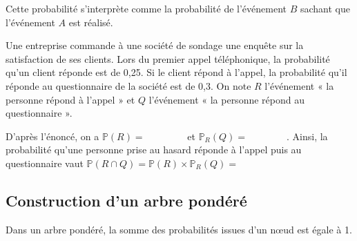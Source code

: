 \documentclass[11pt,fleqn, openany]{book} %
\begin{document}
Cette probabilité s'interprète comme la probabilité de l'événement $B$ sachant que l'événement $A$ est réalisé.

\begin{example}Une entreprise commande à une société de sondage une enquête sur la satisfaction de ses clients. Lors du premier appel téléphonique, la probabilité qu'un client réponde est de 0,25. Si le client répond à l'appel, la probabilité qu'il réponde au questionnaire de la société est de 0,3. On note $R$ l'événement « la personne répond à l'appel » et $Q$ l'événement « la personne répond au questionnaire ». 

D'après l'énoncé, on a $\mathbb{P}(R)=\qquad\qquad$ et $\mathbb{P}_R(Q)=\qquad\qquad$. Ainsi, la probabilité qu'une personne prise au hasard réponde à l'appel puis au questionnaire vaut $\mathbb{P}(R \cap Q) = \mathbb{P}(R) \times \mathbb{P}_R(Q)=$\end{example}

\newpage

\subsection{Construction d'un arbre pondéré}

\begin{proposition} Dans un arbre pondéré, la somme des probabilités issues d'un nœud est égale à 1.
\end{proposition}
\end{document}
